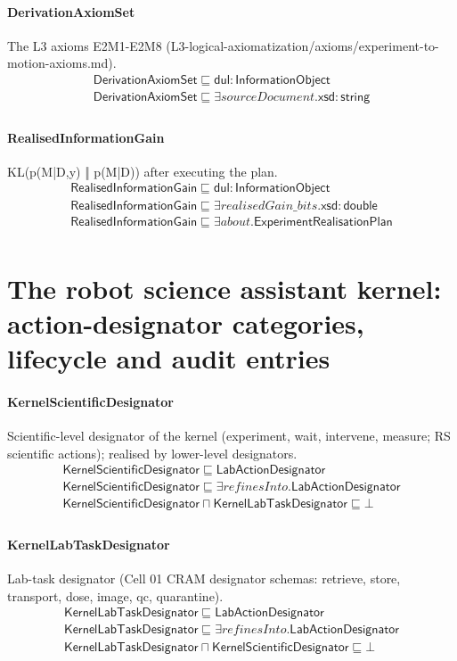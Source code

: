 \documentclass[10pt]{article}
\begin{document}
\paragraph{DerivationAxiomSet} The L3 axioms E2M1-E2M8 (L3-logical-axiomatization/axioms/experiment-to-motion-axioms.md).
\[\begin{array}{l}
\mathsf{DerivationAxiomSet} \sqsubseteq  \mathsf{dul{:}InformationObject} \\
\mathsf{DerivationAxiomSet} \sqsubseteq  \exists \mathit{sourceDocument}.\mathsf{xsd{:}string} \\
\end{array}\]
\paragraph{RealisedInformationGain} KL(p(M|D,y) ‖ p(M|D)) after executing the plan.
\[\begin{array}{l}
\mathsf{RealisedInformationGain} \sqsubseteq  \mathsf{dul{:}InformationObject} \\
\mathsf{RealisedInformationGain} \sqsubseteq  \exists \mathit{realisedGain\_bits}.\mathsf{xsd{:}double} \\
\mathsf{RealisedInformationGain} \sqsubseteq  \exists \mathit{about}.\mathsf{ExperimentRealisationPlan} \\
\end{array}\]
\section*{The robot science assistant kernel: action-designator categories, lifecycle and audit entries}
\paragraph{KernelScientificDesignator} Scientific-level designator of the kernel (experiment, wait, intervene, measure; RS scientific actions); realised by lower-level designators.
\[\begin{array}{l}
\mathsf{KernelScientificDesignator} \sqsubseteq  \mathsf{LabActionDesignator} \\
\mathsf{KernelScientificDesignator} \sqsubseteq  \exists \mathit{refinesInto}.\mathsf{LabActionDesignator} \\
\mathsf{KernelScientificDesignator} \sqcap  \mathsf{KernelLabTaskDesignator} \sqsubseteq  \bot  \\
\end{array}\]
\paragraph{KernelLabTaskDesignator} Lab-task designator (Cell 01 CRAM designator schemas: retrieve, store, transport, dose, image, qc, quarantine).
\[\begin{array}{l}
\mathsf{KernelLabTaskDesignator} \sqsubseteq  \mathsf{LabActionDesignator} \\
\mathsf{KernelLabTaskDesignator} \sqsubseteq  \exists \mathit{refinesInto}.\mathsf{LabActionDesignator} \\
\mathsf{KernelLabTaskDesignator} \sqcap  \mathsf{KernelScientificDesignator} \sqsubseteq  \bot  \\
\end{array}\]
\end{document}
